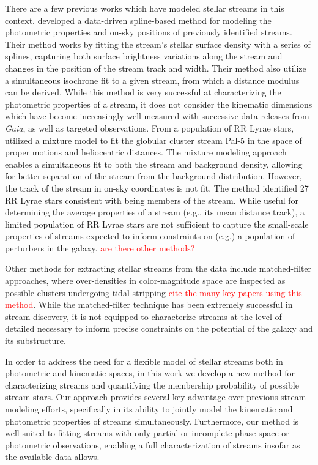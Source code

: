 \documentclass[twocolumn]{aastex631}
\newcommand{\TODO}[1]{{\textcolor{red}{#1}}}
\newcommand{\JN}[1]{\TODO{#1}}
\begin{document}
    There are a few previous works which have modeled stellar streams in this
    context. \citet{Patrick+2022} developed a data-driven spline-based method
    for modeling the photometric properties and on-sky positions of previously
    identified streams. Their method works by fitting the stream's stellar
    surface density with a series of splines, capturing both surface brightness
    variations along the stream and changes in the position of the stream track
    and width. Their method also utilize a simultaneous isochrone fit to a given
    stream, from which a distance modulus can be derived. While this method is
    very successful at characterizing the photometric properties of a stream, it
    does not consider the kinematic dimensions which have become increasingly
    well-measured with successive data releases from {\it Gaia}, as well as
    targeted observations. From a population of RR Lyrae stars,
    \citet{Price-Whelan+2019} utilized a mixture model to fit the globular
    cluster stream Pal-5 in the space of proper motions and heliocentric
    distances. The mixture modeling approach enables a simultaneous fit to both
    the stream and background density, allowing for better separation of the
    stream from the background distribution. However, the track of the stream in
    on-sky coordinates is not fit. The method identified 27 RR Lyrae stars
    consistent with being members of the stream. While useful for determining
    the average properties of a stream (e.g., its mean distance track), a
    limited population of RR Lyrae stars are not sufficient to capture the
    small-scale properties of streams expected to inform constraints on (e.g.) a
    population of perturbers in the galaxy. \JN{are there other methods?}

    Other methods for extracting stellar streams from the data include
    matched-filter approaches, where over-densities in color-magnitude space are
    inspected as possible clusters undergoing tidal stripping \JN{cite the many
    key papers using this method}. While the matched-filter technique has been
    extremely successful in stream discovery, it is not equipped to characterize
    streams at the level of detailed necessary to inform precise constraints on
    the potential of the galaxy and its substructure.

    In order to address the need for a flexible model of stellar streams both in
    photometric and kinematic spaces, in this work we develop a new method for
    characterizing streams and quantifying the membership probability of
    possible stream stars. Our approach provides several key advantage over
    previous stream modeling efforts, specifically in its ability to jointly
    model the kinematic and photometric properties of streams simultaneously.
    Furthermore, our method is well-suited to fitting streams with only partial
    or incomplete phase-space or photometric observations, enabling a full
    characterization of streams insofar as the available data allows. 
\end{document}
